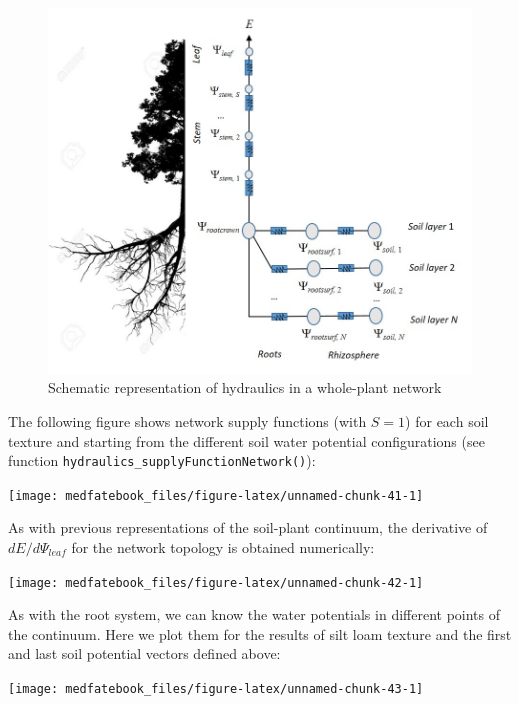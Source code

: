 \documentclass[]{book}
\begin{document}
\begin{figure}

{\centering \includegraphics[width=0.8\linewidth]{hydraulics_nocap} 

}

\caption{Schematic representation of hydraulics in a whole-plant network}\label{fig:unnamed-chunk-40}
\end{figure}

The following figure shows network supply functions (with \(S = 1\)) for each soil texture and starting from the different soil water potential configurations (see function \texttt{hydraulics\_supplyFunctionNetwork()}):

\begin{center}\texttt{[image: medfatebook\_files/figure-latex/unnamed-chunk-41-1]} \end{center}

As with previous representations of the soil-plant continuum, the derivative of \(dE/d\Psi_{leaf}\) for the network topology is obtained numerically:

\begin{center}\texttt{[image: medfatebook\_files/figure-latex/unnamed-chunk-42-1]} \end{center}

As with the root system, we can know the water potentials in different points of the continuum. Here we plot them for the results of silt loam texture and the first and last soil potential vectors defined above:

\begin{center}\texttt{[image: medfatebook\_files/figure-latex/unnamed-chunk-43-1]} \end{center}
\end{document}
